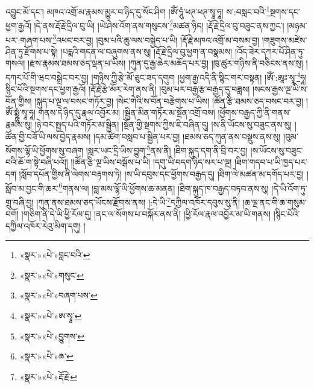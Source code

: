 འབྱུང་མོ་དང་། མཁའ་འགྲོ་མ་རྣམས་མྱུར་བ་ཉིད་དུ་སོང་ཤིག །ཨོཾ་ཧཱུཾ་ཕཊ་ཕཊ་སྭཱ་ཧཱ། ས་:བསླང་བའི་\footnote{«སྣར་»«པེ་»བླང་བའི་}སྔགས་དང་ཕྱག་རྒྱའོ། །དེ་ནས་རྡོ་རྗེ་དྲིལ་བུ་ཡི། །ཡེ་ཤེས་འོག་ནས་གསུངས་\footnote{«སྣར་»«པེ་»གསུང་}མཚན་ཉིད། །རྡོ་རྗེ་དྲིལ་བུ་བཟུང་ནས་ཀྱང་། །མཉམ་པར་:གཞག་པས་\footnote{«སྣར་»«པེ་»བཞག་པས་}འཕང་བར་བྱ། །བུམ་པའི་ཆུ་ལས་བསྐྱེད་པ་ཡི། །རྡོ་རྗེ་མཁའ་འགྲོ་མ་བསམ་བྱ། །གཟུགས་མཛེས་ཤིན་ཏུ་རྫོགས་པ་སྟེ། །པདྨའི་གདན་ལ་བཞུགས་ནས་སུ། །རྡོ་རྗེ་དྲིལ་བུ་ཕྱག་ན་བསྣམས། །འོད་ཟེར་དཀར་པོ་ཤིན་ཏུ་གསལ། །རྫས་རྣམས་ཐམས་ཅད་ལྡན་པ་ཡིས། །ཀུན་དུ་རྒྱ་ཆེར་མཆོད་པར་བྱ། །ཁུ་ཚུར་གཉིས་ནི་བཅིངས་ནས་སུ། །དཀར་པོ་གི་ཝང་བསྒྲེང་བར་བྱ། །གཉིས་ཀྱི་རྩེ་མོ་ཅུང་ཟད་དགུག །ཕྱག་རྒྱ་འདི་ནི་སྙིང་གར་བསྟན། །ཨོཾ་:ཨཱཿ་སྭཱ་\footnote{«སྣར་»«པེ་»ཨ་སྭཱ་}ཧཱ། སྙིང་པོའི་སྔགས་དང་ཕྱག་རྒྱའོ། །རྡོ་རྗེ་རྩེ་མོར་རེག་ནས་ནི། །བུམ་པར་བརྒྱ་རྩ་བརྒྱད་དུ་བཟླས། །སངས་རྒྱས་ལྔ་ཡི་ས་བོན་གྱིས། །སྐུད་པ་ལྔ་ལ་བསང་གཏོར་བྱ། །སེང་གེའི་ས་བོན་བརྩེགས་པ་ཡིས། །ཚོན་རྩི་ཐམས་ཅད་བསང་བར་བྱ། །ཨོཾ་སྨྼྻུཾ་སྭཱ་ཧཱ། གནས་དེ་ཉིད་དུ་རྣལ་འབྱོར་མ། །སྦྱིན་མིན་གཏོར་མ་སྔོན་འགྲོ་བས། །ཕྱོགས་བརྒྱད་ཀྱི་ནི་གནས་རྣམས་སུ། །ཉེ་བར་སྤྱད་པའི་གཏོར་མ་སྦྱིན། །སྔོན་གྱི་སྔགས་ཀྱིས་ཇི་བཞིན་དུ། །ས་ནི་ཡོངས་སུ་བཟུང་ནས་སུ། །ཚོན་གྱི་བཟོ་ཡི་ལས་བྱེད་རྣམས། །དམ་ཚིག་བསླབ་པ་སྦྱིན་པར་བྱ། །ཐམས་ཅད་ཀུན་ནས་བསྡུས་ནས་སུ། །བུམ་སོགས་ལྷོ་ཡི་ཕྱོགས་སུ་བཞག །སླར་ཡང་དྲི་ཡིས་བྱུག་\footnote{«སྣར་»«པེ་»བྱུགས་}ནས་ནི། །ཐིག་སྐུད་དག་ནི་བྲི་བར་བྱ། །ས་ཡོངས་སུ་བཟུང་བའི་ཆོ་ག་སྟེ་བཞི་པའོ།། །།ཚོན་རྩི་ལྔ་ཡིས་བསྒོས་པ་ཡི། །དགུ་ཡི་བདག་ཉིད་སར་པ་ལྔ། །ཐིག་གདབ་པ་ཡི་ཁྱད་པར་དག །སློབ་དཔོན་གྱིས་ནི་ལེགས་བརྟགས་ཏེ། །ས་ཡི་དབུས་དང་ཕྱོགས་བརྒྱད་དུ། །ཐིག་ལེ་མཚན་མ་དགོད་པར་བྱ། །སློབ་མ་བྱང་གི་ཆར་\footnote{«སྣར་»«པེ་»ཆ་}གནས་ལ། །བླ་མས་ལྷོ་ཡི་ཕྱོགས་ཆ་མནན། །ཐིག་སྐུད་ཁ་བརྒྱད་བཏབ་ནས་སུ། །དེ་ཡི་འོག་ཏུ་གྲུ་བཞི་བྱ། །ཀུན་ནས་ཐམས་ཅད་ཡོངས་རྫོགས་ནས། །:དེ་ཡི་\footnote{«སྣར་»«པེ་»རྡོ་རྗེ་}དཀྱིལ་འཁོར་དབུས་སུ་ནི། །ཆ་ལྔ་ནང་གི་ཆ་གསུམ་བགོ། །གཅིག་ནི་དེ་ཡི་ཕྱི་རོལ་དུ། །ནང་ལ་སོགས་པ་བསྐོར་ནས་ནི། །ཕྱི་རོལ་རྣལ་འབྱོར་མ་ཡི་གནས། །སྙིང་པོའི་དཀྱིལ་འཁོར་རེའུ་མིག་དགུ། །
